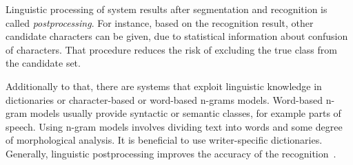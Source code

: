 Linguistic processing of system results after segmentation and recognition
is called \emph{postprocessing}. For instance, based on the recognition result,
other candidate characters can be given, due to statistical information about 
confusion of characters. That procedure reduces the risk of excluding the
true class from the candidate set.

Additionally to that, there are systems that exploit linguistic 
knowledge in dictionaries or character-based or word-based n-grams 
models. Word-based n-gram models usually provide syntactic or semantic classes, 
for example parts of speech. Using n-gram models involves dividing text into 
words and some degree of morphological analysis. It is beneficial to use 
writer-specific dictionaries. Generally, linguistic postprocessing improves
the accuracy of the recognition~.

